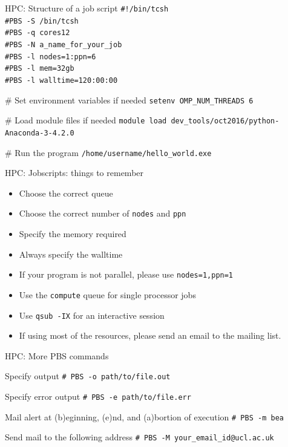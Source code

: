 \documentclass{beamer}
\begin{document}
\begin{frame}{HPC: Structure of a job script}
	\texttt{\#!/bin/tcsh \\
	\#PBS -S /bin/tcsh \\
	\#PBS -q cores12 \\
	\#PBS -N a\_name\_for\_your\_job \\
	\#PBS -l nodes=1:ppn=6 \\
	\#PBS -l mem=32gb \\
	\#PBS -l walltime=120:00:00} \\
	
	\begin{block}{\# Set environment variables if needed}
	    \texttt{setenv OMP\_NUM\_THREADS 6}
        \end{block}
	\begin{block}{\# Load module files if needed}
	    \texttt{module load dev\_tools/oct2016/python-Anaconda-3-4.2.0}
        \end{block}
	\begin{block}{\# Run the program}
	    \texttt{/home/username/hello\_world.exe}
        \end{block}	
\end{frame}

\begin{frame}{HPC: Jobscripts: things to remember}
	\begin{itemize}
		\item Choose the correct queue
		\item Choose the correct number of \texttt{nodes} and \texttt{ppn}
		\item Specify the memory required
		\item Always specify the walltime
		\item If your program is not parallel, please use \texttt{nodes=1,ppn=1}
		\item Use the \texttt{compute} queue for single processor jobs
		\item Use \texttt{qsub -IX} for an interactive session
		\item If using most of the resources, please send an email to the mailing list.
	\end{itemize}
\end{frame}

\begin{frame}{HPC: More PBS commands}
	\begin{block}{Specify output}
	    \texttt{\# PBS -o path/to/file.out}
        \end{block}
	\begin{block}{Specify error output}
	    \texttt{\# PBS -e path/to/file.err}
        \end{block}
	\begin{block}{Mail alert at (b)eginning, (e)nd, and (a)bortion of execution}
	    \texttt{\# PBS -m bea}
        \end{block}
	\begin{block}{Send mail to the following address}
	    \texttt{\# PBS -M your\_email\_id@ucl.ac.uk}
        \end{block}                        
\end{frame}
\end{document}
